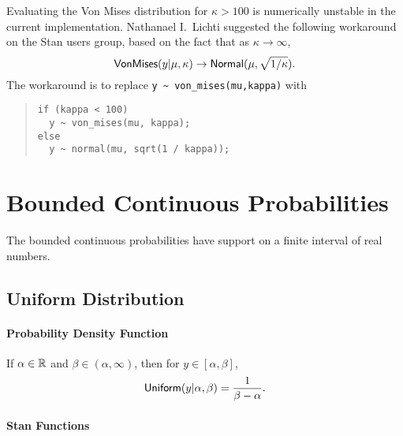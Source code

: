 Evaluating the Von Mises distribution for $\kappa > 100$ is
numerically unstable in the current implementation.  Nathanael I.\
Lichti suggested the following workaround on the Stan users group,
based on the fact that as $\kappa \rightarrow \infty$,
\[
\distro{VonMises}(y|\mu,\kappa) \rightarrow \distro{Normal}(\mu,
\sqrt{1 / \kappa}).
\]
%
The workaround is to replace \Verb|y ~ von_mises(mu,kappa)| with
%
\begin{quote}
\begin{Verbatim}
if (kappa < 100)
  y ~ von_mises(mu, kappa);
else 
  y ~ normal(mu, sqrt(1 / kappa));
\end{Verbatim}
\end{quote} 


\chapter{Bounded Continuous Probabilities}

\noindent
The bounded continuous probabilities have support on a finite interval
of real numbers.



\section{Uniform Distribution}

\subsubsection{Probability Density Function}

If $\alpha \in \reals$ and $\beta \in (\alpha,\infty)$, then for $y
\in [\alpha,\beta]$,
\[
\distro{Uniform}(y|\alpha,\beta)
= 
\frac{1}{\beta - \alpha}
.
\]


\subsubsection{Stan Functions}

